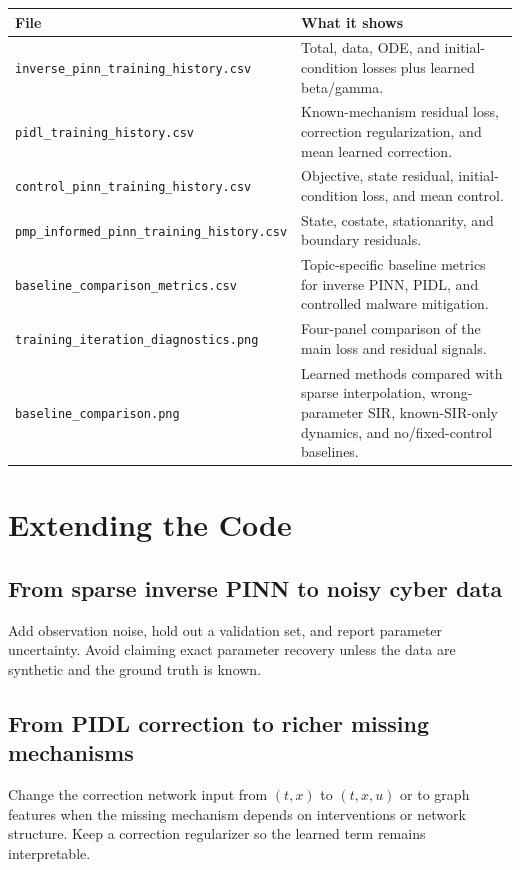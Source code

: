 \documentclass[11pt,a4paper]{article}
\begin{document}
\begin{longtable}{p{}p{}}
\toprule
File & What it shows \\
\midrule
\texttt{inverse\_pinn\_}\newline\texttt{training\_history.csv} & Total, data, ODE, and initial-condition losses plus learned beta/gamma. \\
\texttt{pidl\_}\newline\texttt{training\_history.csv} & Known-mechanism residual loss, correction regularization, and mean learned correction. \\
\texttt{control\_pinn\_}\newline\texttt{training\_history.csv} & Objective, state residual, initial-condition loss, and mean control. \\
\texttt{pmp\_informed\_pinn\_}\newline\texttt{training\_history.csv} & State, costate, stationarity, and boundary residuals. \\
\texttt{baseline\_comparison\_}\newline\texttt{metrics.csv} & Topic-specific baseline metrics for inverse PINN, PIDL, and controlled malware mitigation. \\
\texttt{training\_iteration\_}\newline\texttt{diagnostics.png} & Four-panel comparison of the main loss and residual signals. \\
\texttt{baseline\_comparison.png} & Learned methods compared with sparse interpolation, wrong-parameter SIR, known-SIR-only dynamics, and no/fixed-control baselines. \\
\bottomrule
\end{longtable}

\section{Extending the Code}
\subsection{From sparse inverse PINN to noisy cyber data}
Add observation noise, hold out a validation set, and report parameter uncertainty. Avoid claiming exact parameter recovery unless the data are synthetic and the ground truth is known.

\subsection{From PIDL correction to richer missing mechanisms}
Change the correction network input from \((t,x)\) to \((t,x,u)\) or to graph features when the missing mechanism depends on interventions or network structure. Keep a correction regularizer so the learned term remains interpretable.
\end{document}
